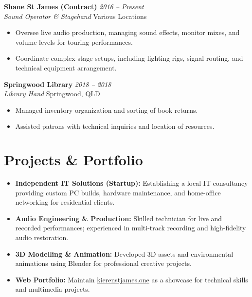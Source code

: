 \documentclass[11pt, a4paper]{article}
\begin{document}
\vspace{8pt}

\textbf{Shane St James (Contract)} \hfill \textit{2016 -- Present} \\
\textit{Sound Operator \& Stagehand} \hfill Various Locations
\begin{itemize}
    \item Oversee live audio production, managing sound effects, monitor mixes, and volume levels for touring performances.
    \item Coordinate complex stage setups, including lighting rigs, signal routing, and technical equipment arrangement.
\end{itemize}

\vspace{8pt}

\textbf{Springwood Library} \hfill \textit{2018 -- 2018} \\
\textit{Library Hand} \hfill Springwood, QLD
\begin{itemize}
    \item Managed inventory organization and sorting of book returns.
    \item Assisted patrons with technical inquiries and location of resources.
\end{itemize}

\section{Projects \& Portfolio}
\begin{itemize}
    \item \textbf{Independent IT Solutions (Startup):} Establishing a local IT consultancy providing custom PC builds, hardware maintenance, and home-office networking for residential clients.
    \item \textbf{Audio Engineering \& Production:} Skilled technician for live and recorded performances; experienced in multi-track recording and high-fidelity audio restoration.
    \item \textbf{3D Modelling \& Animation:} Developed 3D assets and environmental animations using Blender for professional creative projects.
    \item \textbf{Web Portfolio:} Maintain \href{http://www.kierenstjames.one}{kierenstjames.one} as a showcase for technical skills and multimedia projects.
\end{itemize}

\end{document}
